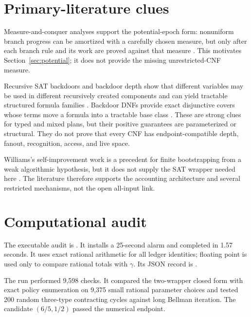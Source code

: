 \documentclass[11pt]{article}
\begin{document}
\section{Primary-literature clues}

Measure-and-conquer analyses support the potential-epoch form: nonuniform
branch progress can be amortized with a carefully chosen measure, but only
after each branch rule and its work are proved against that measure
\cite{FominGrandoniKratsch2009}.  This motivates Section~\ref{sec:potential};
it does not provide the missing unrestricted-CNF measure.

Recursive SAT backdoors and backdoor depth show that different variables may
be used in different recursively created components and can yield tractable
structured formula families \cite{MaehlmannSiebertzVigny2021,
DreierOrdyniakSzeider2022}.  Backdoor DNFs provide exact disjunctive covers
whose terms move a formula into a tractable base class
\cite{OrdyniakSchidlerSzeider2021}.  These are strong clues for typed and mixed
plans, but their positive guarantees are parameterized or structural.  They
do not prove that every CNF has endpoint-compatible depth, fanout,
recognition, access, and live space.

Williams's self-improvement work is a precedent for finite bootstrapping from
a weak algorithmic hypothesis, but it does not supply the SAT wrapper needed
here \cite{Williams2024}.  The literature therefore supports the accounting
architecture and several restricted mechanisms, not the open all-input link.

\section{Computational audit}

The executable audit is
.  It installs a
25-second alarm and completed in 1.57 seconds.  It uses exact rational
arithmetic for all ledger identities; floating point is used only to compare
rational totals with \(\gamma\).  Its JSON record is
.

The run performed 9,598 checks.  It compared the two-wrapper closed form with
exact policy enumeration on 9,375 small rational parameter choices and
tested 200 random three-type contracting cycles against long Bellman
iteration.  The candidate \((6/5,1/2)\) passed the numerical endpoint.
\end{document}
